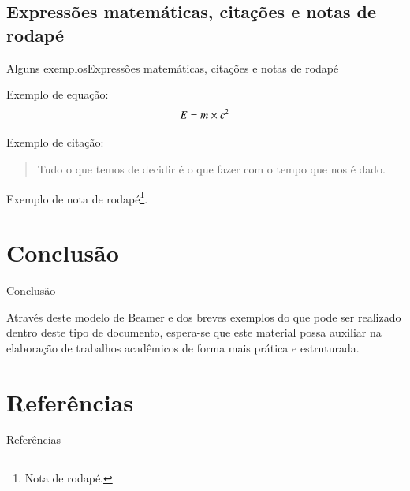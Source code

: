 \documentclass[aspectratio=169]{beamer}
\let\oldfootnote\footnote
\renewcommand\footnote[1][]{\oldfootnote[frame,#1]}
\begin{document}
\subsection{Expressões matemáticas, citações e notas de rodapé}
\begin{frame}{Alguns exemplos}{Expressões matemáticas, citações e notas de rodapé}


Exemplo de equação:
    \begin{equation}
    \centering 
	\label{t:tabela} 
        E = m \times c^2
    \end{equation}\vspace{10px}
    
Exemplo de citação:\vspace{10px}

	\begin{quote}
		Tudo o que temos de decidir é o que fazer com o tempo que nos é dado.
	\end{quote}
	
	\begin{flushright}
		\textsc{}
	\end{flushright}\vspace{10px}
	
Exemplo de nota de rodapé\footnote{Nota de rodapé.}.

\end{frame}



\section{Conclusão}
\begin{frame}{Conclusão}

    \justifying Através deste modelo de Beamer e dos breves exemplos do que pode ser realizado dentro deste tipo de documento, espera-se que este material possa auxiliar na elaboração de trabalhos acadêmicos de forma mais prática e estruturada.
    
\nocite{latex}
\nocite{Mori}
	
\end{frame}

\section{Referências}


\begin{frame}[allowframebreaks]{Referências}

\end{frame}

\end{document}
